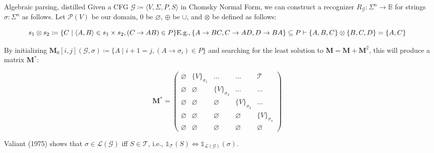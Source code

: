 \documentclass{beamer}
\begin{document}
    \begin{frame}[fragile]{Algebraic parsing, distilled}
        Given a CFG $\mathcal{G} \coloneqq \langle V, \Sigma, P, S\rangle$ in Chomsky Normal Form, we can construct a recognizer $R_\mathcal{G}: \Sigma^n \rightarrow \mathbb{B}$ for strings $\sigma: \Sigma^n$ as follows. Let $\mathcal P(V)$ be our domain, $0$ be $\varnothing$, $\oplus$ be $\cup$, and $\otimes$ be defined as follows:

        \vspace{-7pt}
        \[
            s_1 \otimes s_2 \coloneqq \{C \mid \langle A, B\rangle \in s_1 \times s_2, (C\rightarrow AB) \in P\}\\
            \text{E.g.},
                \{A \rightarrow BC, C \rightarrow AD, D \rightarrow BA\} \subseteq P \vdash \{A, B, C\} \otimes \{B, C, D\} = \{A, C\}
        \]
        \vspace{16pt}

        \noindent By initializing $\mathbf{M}_0[i, j](\mathcal{G}, \sigma) \coloneqq \{A \mid i + 1 = j, (A \rightarrow \sigma_i) \in P\}$ and searching for the least solution to $\mathbf{M} = \mathbf{M} + \mathbf{M}^2$, this will produce a matrix $\mathbf{M}^*$:

        \vspace{-5}
        \[
            \mathbf{M}^* = \begin{pmatrix}
                               \varnothing & \{V\}_{\sigma_1} & \ldots & \ldots & \mathcal{T} \\
                               \varnothing & \varnothing & \{V\}_{\sigma_2} & \ldots & \ldots \\
                               \varnothing & \varnothing & \varnothing & \{V\}_{\sigma_3} & \ldots \\
                               \varnothing & \varnothing & \varnothing & \varnothing & \{V\}_{\sigma_4} \\
                               \varnothing & \varnothing & \varnothing & \varnothing & \varnothing
            \end{pmatrix}
        \]

        \noindent Valiant (1975) shows that $\sigma \in \mathcal{L}(\mathcal{G})$ iff $S \in \mathcal{T}$, i.e., $\mathds{1}_{\mathcal{T}}(S) \iff \mathds{1}_{\mathcal{L}(\mathcal{G})}(\sigma)$.
    \end{frame}
\end{document}
